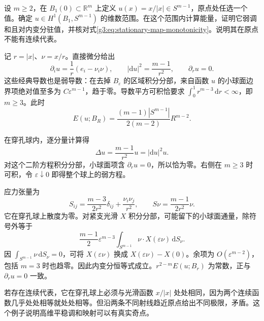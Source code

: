 \begin{exercise}\label{g3:ex:radial-weak-harmonic-map}
	设 \(m\ge2\)，在 \(B_1(0)\subset\mathbb R^m\) 上定义 \(u(x)=x/|x|\in S^{m-1}\)，原点处任选一个值。确定 \(u\in H^1(B_1,S^{m-1})\) 的维数范围。在这个范围内计算能量，证明它弱调和且对内变分驻值，并核对式\eqref{g3:eq:stationary-map-monotonicity}。说明其在原点不能有连续代表。
\end{exercise}
\begin{solution}
	记 \(r=|x|\)、\(\nu=x/r\)。直接微分给出
	\[
		\partial_i u=\frac1r(e_i-\nu_i\nu),\qquad
		|\mathrm du|^2=\frac{m-1}{r^2},\qquad \partial_ru=0.
	\]
	这些经典导数也是弱导数：在去掉 \(B_\varepsilon\) 的区域积分分部，来自函数 \(u\) 的小球面边界项绝对值至多为 \(C\varepsilon^{m-1}\)，趋于零。导数平方可积恰要求 \(\int_0^1r^{m-3}\,\mathrm dr<\infty\)，即 \(m\ge3\)。此时
	\[
		E(u;B_R)=\frac{(m-1)|S^{m-1}|}{2(m-2)}R^{m-2}.
	\]

	在穿孔球内，逐分量计算得
	\[
		\Delta u=\frac{m-1}{r^2}u=|\mathrm du|^2u.
	\]
	对这个二阶方程积分分部，小球面项含 \(\partial_ru=0\)，所以恰为零。右侧在 \(m\ge3\) 时可积，令 \(\varepsilon\downarrow0\) 即得整个球上的弱方程。

	应力张量为
	\[
		S_{ij}=\frac{m-3}{2r^2}\delta_{ij}+\frac{\nu_i\nu_j}{r^2},
		\qquad S\nu=\frac{m-1}{2r^2}\nu.
	\]
	它在穿孔球上散度为零。对紧支光滑 \(X\) 积分分部，可能留下的小球面通量，除符号外等于
	\[
		\frac{m-1}{2}\varepsilon^{m-3}
		\int_{S^{m-1}}\nu\cdot X(\varepsilon\nu)\,\mathrm dS_\nu.
	\]
	因 \(\int_{S^{m-1}}\nu\,\mathrm dS_\nu=0\)，可将 \(X(\varepsilon\nu)\) 换成 \(X(\varepsilon\nu)-X(0)\)。余项为 \(O(\varepsilon^{m-2})\)，包括 \(m=3\) 时也趋零。因此内变分恒等式成立。\(r^{2-m}E(u;B_r)\) 为常数，正与 \(\partial_ru=0\) 一致。

	若存在连续代表，它在穿孔球上必须与光滑函数 \(x/|x|\) 处处相同，因为两个连续函数几乎处处相等就处处相等。但沿两条不同射线趋近原点给出不同极限，矛盾。这个例子说明高维平稳调和映射可以有真实奇点。
\end{solution}

